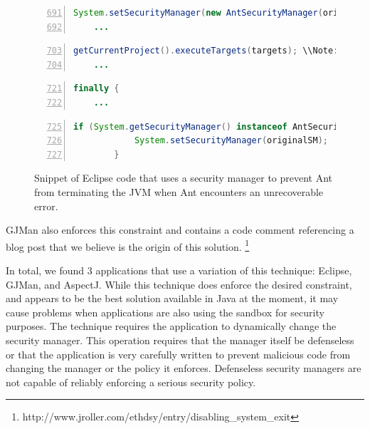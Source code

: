 \documentclass{sig-alternate}
\begin{document}
\begin{figure}
\begin{lstlisting}[language=Java,numbers=left,basicstyle={\scriptsize},breaklines=true,firstnumber=691,xrightmargin={0.1cm},numbersep={-10pt}]
    System.setSecurityManager(new AntSecurityManager(originalSM, Thread.currentThread()));
    ...
\end{lstlisting}


\begin{lstlisting}[language=Java,numbers=left,basicstyle={\scriptsize},breaklines=true,firstnumber=703,xrightmargin={0.1cm},numbersep={-10pt}]
    getCurrentProject().executeTargets(targets); \\Note: Ant is executed on this line
    ...
\end{lstlisting}


\begin{lstlisting}[language=Java,numbers=left,basicstyle={\scriptsize},breaklines=true,firstnumber=721,xrightmargin={0.1cm},numbersep={-10pt}]
    finally {
    ...
\end{lstlisting}


\begin{lstlisting}[language=Java,numbers=left,basicstyle={\scriptsize},breaklines=true,firstnumber=725,xrightmargin={0.1cm},numbersep={-10pt}]
        if (System.getSecurityManager() instanceof AntSecurityManager) { 
            System.setSecurityManager(originalSM); 
        }
\end{lstlisting}


\protect\caption{Snippet of Eclipse code that uses a security manager to prevent Ant
from terminating the JVM when Ant encounters an unrecoverable error.}\label{fig:Eclipse-snippet}
\end{figure}

GJMan also enforces this constraint and contains a code comment referencing a
blog post that we believe is the origin of this solution.%
\footnote{http://www.jroller.com/ethdsy/entry/disabling\_system\_exit%
} 

In total, we found 3 applications that use a variation of this technique:
Eclipse, GJMan, and AspectJ. While this technique does enforce the
desired constraint, and appears to be the best solution available
in Java at the moment, it may cause problems when applications are
also using the sandbox for security purposes. The technique requires
the application to dynamically change the security manager. This operation
requires that the manager itself be defenseless or that the application
is very carefully written to prevent malicious code from changing
the manager or the policy it enforces. Defenseless security managers
are not capable of reliably enforcing a serious security policy.
\end{document}
